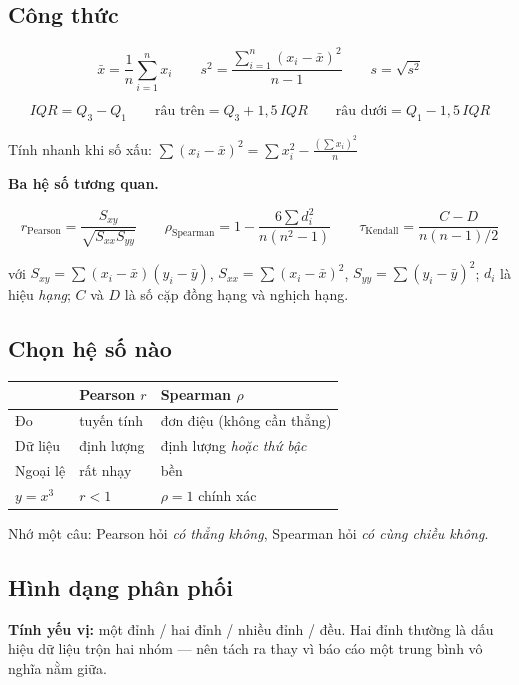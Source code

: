 \documentclass[11pt]{article}
\begin{document}
\subsection*{Công thức}

\[
\bar{x} = \frac{1}{n}\sum_{i=1}^{n} x_i
\qquad
s^2 = \frac{\sum_{i=1}^{n}(x_i-\bar{x})^2}{n-1}
\qquad
s = \sqrt{s^2}
\]

\[
IQR = Q_3 - Q_1
\qquad
\text{râu trên} = Q_3 + 1{,}5\,IQR
\qquad
\text{râu dưới} = Q_1 - 1{,}5\,IQR
\]

Tính nhanh khi số xấu:
$\displaystyle\sum (x_i-\bar{x})^2 = \sum x_i^2 - \frac{\left(\sum x_i\right)^2}{n}$

\textbf{Ba hệ số tương quan.}

\[
r_{\text{Pearson}} = \frac{S_{xy}}{\sqrt{S_{xx}S_{yy}}}
\qquad
\rho_{\text{Spearman}} = 1 - \frac{6\sum d_i^2}{n(n^2-1)}
\qquad
\tau_{\text{Kendall}} = \frac{C-D}{n(n-1)/2}
\]

với $S_{xy}=\sum(x_i-\bar x)(y_i-\bar y)$, $S_{xx}=\sum(x_i-\bar x)^2$,
$S_{yy}=\sum(y_i-\bar y)^2$; $d_i$ là hiệu \emph{hạng}; $C$ và $D$ là số cặp đồng
hạng và nghịch hạng.

\subsection*{Chọn hệ số nào}

\begin{center}
\begin{tabular}{@{}lll@{}}
\toprule
 & \textbf{Pearson} $r$ & \textbf{Spearman} $\rho$ \\
\midrule
Đo & tuyến tính & đơn điệu (không cần thẳng) \\
Dữ liệu & định lượng & định lượng \emph{hoặc thứ bậc} \\
Ngoại lệ & rất nhạy & bền \\
$y=x^3$ & $r<1$ & $\rho=1$ chính xác \\
\bottomrule
\end{tabular}
\end{center}

Nhớ một câu: Pearson hỏi \emph{có thẳng không}, Spearman hỏi \emph{có cùng chiều không}.

\subsection*{Hình dạng phân phối}

\textbf{Tính yếu vị:} một đỉnh / hai đỉnh / nhiều đỉnh / đều. Hai đỉnh thường là
dấu hiệu dữ liệu trộn hai nhóm --- nên tách ra thay vì báo cáo một trung bình vô
nghĩa nằm giữa.
\end{document}

